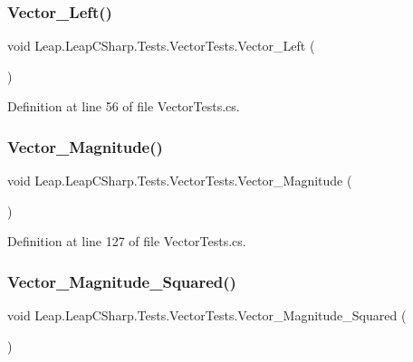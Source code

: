 \subsubsection{\texorpdfstring{Vector\_Left()}{Vector\_Left()}}
{\footnotesize\ttfamily void Leap.\+Leap\+C\+Sharp.\+Tests.\+Vector\+Tests.\+Vector\+\_\+\+Left (\begin{DoxyParamCaption}{ }\end{DoxyParamCaption})}



Definition at line 56 of file Vector\+Tests.\+cs.

\mbox{\label{class_leap_1_1_leap_c_sharp_1_1_tests_1_1_vector_tests_a12b9148aad0254e6a0aa51f90d6ca07b}} 
\subsubsection{\texorpdfstring{Vector\_Magnitude()}{Vector\_Magnitude()}}
{\footnotesize\ttfamily void Leap.\+Leap\+C\+Sharp.\+Tests.\+Vector\+Tests.\+Vector\+\_\+\+Magnitude (\begin{DoxyParamCaption}{ }\end{DoxyParamCaption})}



Definition at line 127 of file Vector\+Tests.\+cs.

\mbox{\label{class_leap_1_1_leap_c_sharp_1_1_tests_1_1_vector_tests_a31575f9e35f1950d4b0a5b6364e65bf8}} 
\subsubsection{\texorpdfstring{Vector\_Magnitude\_Squared()}{Vector\_Magnitude\_Squared()}}
{\footnotesize\ttfamily void Leap.\+Leap\+C\+Sharp.\+Tests.\+Vector\+Tests.\+Vector\+\_\+\+Magnitude\+\_\+\+Squared (\begin{DoxyParamCaption}{ }\end{DoxyParamCaption})}



